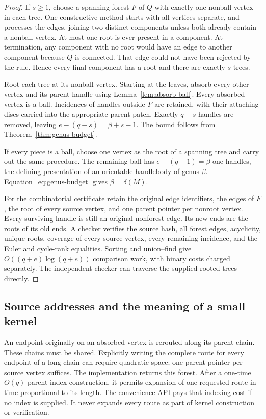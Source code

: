 \begin{proof}
If $s\geq1$, choose a spanning forest $F$ of $Q$ with exactly one nonball
vertex in each tree.  One constructive method starts with all vertices
separate, and processes the edges, joining two distinct components unless
both already contain a nonball vertex.  At most one root is ever present
in a component.  At termination, any component with no root would have
an edge to another component because $Q$ is connected.  That edge could
not have been rejected by the rule.  Hence every final component has a
root and there are exactly $s$ trees.

Root each tree at its nonball vertex.  Starting at the leaves, absorb
every other vertex and its parent handle using
Lemma~\ref{lem:absorb-ball}.  Every absorbed vertex is a ball.  Incidences
of handles outside $F$ are retained, with their attaching discs carried
into the appropriate parent patch.  Exactly $q-s$ handles are removed,
leaving
$e-(q-s)=\beta+s-1$.  The bound follows from
Theorem~\ref{thm:genus-budget}.

If every piece is a ball, choose one vertex as the root of a spanning
tree and carry out the same procedure.  The remaining ball has
$e-(q-1)=\beta$ one-handles, the defining presentation of an orientable
handlebody of genus $\beta$.  Equation~\eqref{eq:genus-budget} gives
$\beta=\delta(M)$.

For the combinatorial certificate retain the original edge identifiers,
the edges of $F$, the root of every source vertex, and one parent pointer
per nonroot vertex.  Every surviving handle is still an original
nonforest edge.  Its new ends are the roots of its old ends.  A checker
verifies the source hash, all forest edges, acyclicity, unique roots,
coverage of every source vertex, every remaining incidence, and the Euler
and cycle-rank equalities.  Sorting and union--find give
$O((q+e)\log(q+e))$ comparison work, with binary costs charged separately.
The independent checker can traverse the supplied rooted trees directly.
\end{proof}

\subsection{Source addresses and the meaning of a small kernel}

An endpoint originally on an absorbed vertex is rerouted along its parent
chain.  These chains must be shared.  Explicitly writing the complete
route for every endpoint of a long chain can require quadratic space;
one parent pointer per source vertex suffices.  The implementation returns
this forest.  After a one-time $O(q)$ parent-index construction, it permits
expansion of one requested route in time proportional to its length.
The convenience API pays that indexing cost if no index is supplied.
It never expands every route as part of
kernel construction or verification.

